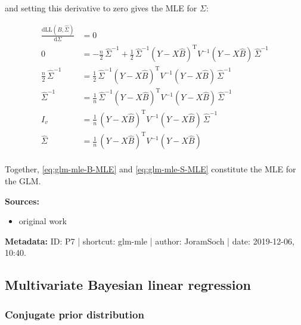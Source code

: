 \documentclass[a4paper,12pt,twoside]{book}
\begin{document}
and setting this derivative to zero gives the MLE for $\Sigma$:

\begin{equation} \label{eq:glm-mle-S-MLE}
\begin{split}
\frac{\mathrm{d}\mathrm{LL}(\hat{B},\hat{\Sigma})}{\mathrm{d}\Sigma} &= 0 \\
0 &= - \frac{n}{2} \, \hat{\Sigma}^{-1} + \frac{1}{2} \, \hat{\Sigma}^{-1} (Y - X\hat{B})^\mathrm{T} V^{-1} (Y - X\hat{B}) \, \hat{\Sigma}^{-1} \\
\frac{n}{2} \, \hat{\Sigma}^{-1} &= \frac{1}{2} \, \hat{\Sigma}^{-1} (Y - X\hat{B})^\mathrm{T} V^{-1} (Y - X\hat{B}) \, \hat{\Sigma}^{-1} \\
\hat{\Sigma}^{-1} &= \frac{1}{n} \, \hat{\Sigma}^{-1} (Y - X\hat{B})^\mathrm{T} V^{-1} (Y - X\hat{B}) \, \hat{\Sigma}^{-1} \\
I_v &= \frac{1}{n} \, (Y - X\hat{B})^\mathrm{T} V^{-1} (Y - X\hat{B}) \, \hat{\Sigma}^{-1} \\
\hat{\Sigma} &= \frac{1}{n} \, (Y - X\hat{B})^\mathrm{T} V^{-1} (Y - X\hat{B}) \\
\end{split}
\end{equation}

\vspace{1em}
Together, \eqref{eq:glm-mle-B-MLE} and \eqref{eq:glm-mle-S-MLE} constitute the MLE for the GLM.


\vspace{1em}
\textbf{Sources:}
\begin{itemize}
\item original work\end{itemize}


\vspace{1em}
\textbf{Metadata:} ID: P7 | shortcut: glm-mle | author: JoramSoch | date: 2019-12-06, 10:40.
\vspace{1em}



\subsection{Multivariate Bayesian linear regression}

\subsubsection[\textbf{Conjugate prior distribution}]{Conjugate prior distribution} \label{sec:mblr-prior}
\setcounter{equation}{0}
\end{document}
